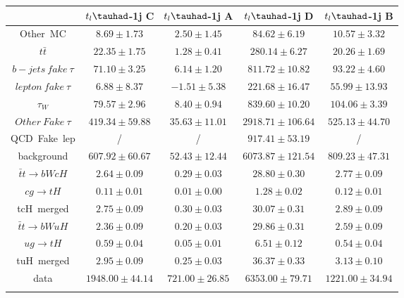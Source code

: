 \centering
\begin{tabular}{ccccc} \toprule\toprule
 & $t_{l}\tauhad$-1j C & $t_{l}\tauhad$-1j A & $t_{l}\tauhad$-1j D & $t_{l}\tauhad$-1j B\\\midrule
\hspace{3mm}Other~MC & $8.69\pm1.73$ & $2.50\pm1.45$ & $84.62\pm6.19$ & $10.57\pm3.32$\\
\hspace{3mm}$t\bar{t}$ & $22.35\pm1.75$ & $1.28\pm0.41$ & $280.14\pm6.27$ & $20.26\pm1.69$\\
\hspace{3mm}$b-jets~fake~\tau$ & $71.10\pm3.25$ & $6.14\pm1.20$ & $811.72\pm10.82$ & $93.22\pm4.60$\\
\hspace{3mm}$lepton~fake~\tau$ & $6.88\pm8.37$ & $-1.51\pm5.38$ & $221.68\pm16.47$ & $55.99\pm13.93$\\
\hspace{3mm}$\tau_{W}$ & $79.57\pm2.96$ & $8.40\pm0.94$ & $839.60\pm10.20$ & $104.06\pm3.39$\\
\hspace{3mm}$Other~Fake~\tau$ & $419.34\pm59.88$ & $35.63\pm11.01$ & $2918.71\pm106.64$ & $525.13\pm44.70$\\
\hspace{3mm}QCD~Fake~lep &  / &  / & $917.41\pm53.19$ &  /\\
background & $607.92\pm60.67$ & $52.43\pm12.44$ & $6073.87\pm121.54$ & $809.23\pm47.31$\\\midrule
\hspace{3mm}$\bar{t}t\to bWcH$ & $2.64\pm0.09$ & $0.29\pm0.03$ & $28.80\pm0.30$ & $2.77\pm0.09$\\
\hspace{3mm}$cg\to tH$ & $0.11\pm0.01$ & $0.01\pm0.00$ & $1.28\pm0.02$ & $0.12\pm0.01$\\
tcH~merged & $2.75\pm0.09$ & $0.30\pm0.03$ & $30.07\pm0.31$ & $2.89\pm0.09$\\
\hspace{3mm}$\bar{t}t\to bWuH$ & $2.36\pm0.09$ & $0.20\pm0.03$ & $29.86\pm0.31$ & $2.59\pm0.09$\\
\hspace{3mm}$ug\to tH$ & $0.59\pm0.04$ & $0.05\pm0.01$ & $6.51\pm0.12$ & $0.54\pm0.04$\\
tuH~merged & $2.95\pm0.09$ & $0.25\pm0.03$ & $36.37\pm0.33$ & $3.13\pm0.10$\\\midrule
data & $1948.00\pm44.14$ & $721.00\pm26.85$ & $6353.00\pm79.71$ & $1221.00\pm34.94$\\
\bottomrule\bottomrule\\
\end{tabular}
